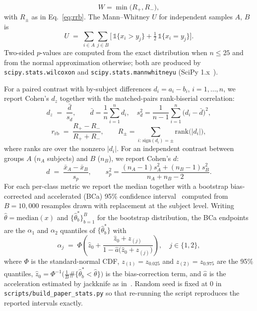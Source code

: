 \documentclass[10pt,a4paper]{article}
\begin{document}
\begin{equation}
  W = \min\!\bigl(R_{+},R_{-}\bigr),
  \label{eq:wilcoxon}
  \end{equation}
  with $R_{\pm}$ as in Eq.~\eqref{eq:rrb}. The Mann--Whitney $U$ for independent samples $A$, $B$ is
  \begin{equation}
  U
  \;=\;
  \sum_{i \in A}\sum_{j \in B}
  \bigl[\,\mathbb{1}\{x_{i}>y_{j}\} + \tfrac{1}{2}\,\mathbb{1}\{x_{i}=y_{j}\}\bigr].
  \label{eq:mwu}
  \end{equation}
  Two-sided $p$-values are computed from the exact distribution when $n\le 25$ and from the normal approximation otherwise; both are produced by \texttt{scipy.stats.wilcoxon} and
  \texttt{scipy.stats.mannwhitneyu} (SciPy 1.x~\cite{virtanen2020}).


For a paired contrast with by-subject differences $d_{i}=a_{i}-b_{i}$, $i=1,\ldots,n$, we report Cohen's $d_{z}$ together with the matched-pairs rank-biserial correlation:
  \begin{equation}
  d_{z}
  \;=\;
  \frac{\bar{d}}{s_{d}},
  \qquad
  \bar{d}=\frac{1}{n}\sum_{i=1}^{n} d_{i},
  \quad
  s_{d}^{2} = \frac{1}{n-1}\sum_{i=1}^{n}\bigl(d_{i}-\bar{d}\bigr)^{2},
  \label{eq:dz}
  \end{equation}
  \begin{equation}
  r_{\mathrm{rb}}
  \;=\;
  \frac{R_{+} - R_{-}}{R_{+} + R_{-}},
  \qquad
  R_{\pm} = \!\!\!\sum_{i:\,\mathrm{sign}(d_{i})=\pm}\!\!\!\mathrm{rank}\bigl(|d_{i}|\bigr),
  \label{eq:rrb}
  \end{equation}
  where ranks are over the nonzero $|d_{i}|$. For an independent contrast between groups $A$ ($n_{A}$ subjects) and $B$ ($n_{B}$), we report Cohen's $d$:
  \begin{equation}
  d
  \;=\;
  \frac{\bar{x}_{A} - \bar{x}_{B}}{s_{p}},
  \qquad
  s_{p}^{2}
  =
  \frac{(n_{A}-1)s_{A}^{2} + (n_{B}-1)s_{B}^{2}}{n_{A}+n_{B}-2}.
  \label{eq:cohend}
  \end{equation}
For each per-class metric we report the median together with a bootstrap bias-corrected and accelerated (BCa) 95\% confidence interval~\cite{efron1987} computed from $B=10{,}000$
  resamples drawn with replacement at the subject level. Writing $\hat{\theta}=\mathrm{median}(x)$ and $\{\hat{\theta}^{*}_{b}\}_{b=1}^{B}$ for the bootstrap distribution, the BCa
  endpoints are the $\alpha_{1}$ and $\alpha_{2}$ quantiles of $\{\hat{\theta}^{*}_{b}\}$ with
  \begin{equation}
  \alpha_{j}
  \;=\;
  \Phi\!\left(\hat{z}_{0} + \frac{\hat{z}_{0}+z_{(j)}}{1 - \hat{a}\bigl(\hat{z}_{0}+z_{(j)}\bigr)}\right),
  \quad j\in\{1,2\},
  \label{eq:bca}
  \end{equation}
  where $\Phi$ is the standard-normal CDF, $z_{(1)}=z_{0.025}$ and $z_{(2)}=z_{0.975}$ are the 95\% quantiles,
  $\hat{z}_{0}=\Phi^{-1}\!\bigl(\tfrac{1}{B}\#\{\hat{\theta}^{*}_{b}<\hat{\theta}\}\bigr)$ is the bias-correction term, and $\hat{a}$ is the acceleration estimated by jackknife as
  in~\cite{efron1987}. Random seed is fixed at $0$ in \texttt{scripts/build\_paper\_stats.py} so that re-running the script reproduces the reported intervals exactly.
\end{document}
